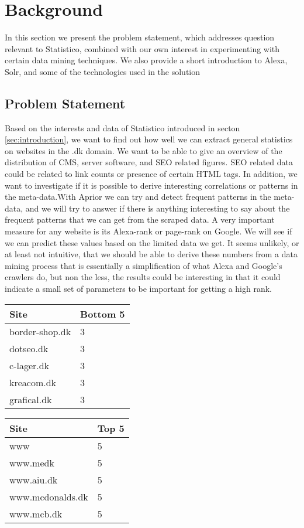 \section{Background}
\label{sec:background}
In this section we present the problem statement, which addresses question relevant to Statistico, combined with our own interest in experimenting with certain data mining techniques. We also provide a short introduction to Alexa, Solr, and some of the technologies used in the solution

\subsection{Problem Statement}
\label{subsec:problem_statement}
Based on the interests and data of Statistico introduced in secton \ref{sec:introduction}, we want to find out how well we can extract general statistics on websites in the .dk domain. We want to be able to give an overview of the distribution of CMS, server software, and SEO related figures. SEO related data could be related to link counts or presence of certain HTML tags.
In addition, we want to investigate if it is possible to derive interesting correlations or patterns in the meta-data.With Aprior we can try and detect frequent patterns in the meta-data, and we will try to answer if there is anything interesting to say about the frequent patterns that we can get from the scraped data.
A very important measure for any website is its Alexa-rank or page-rank on Google. We will see if we can predict these values based on the limited data we get. It seems unlikely, or at least not intuitive, that we should be able to derive these numbers from a data mining process that is essentially a simplification of what Alexa and Google's crawlers do, but non the less, the results could be interesting in that it could indicate a small set of parameters to be important for getting a high rank.

\begin{tabular}{ p{130pt} | p{50pt} }
Site & Bottom 5\\
\hline border-shop.dk & 3\\
\hline dotseo.dk & 3\\
\hline c-lager.dk & 3\\
\hline kreacom.dk & 3\\
\hline grafical.dk & 3\\
\hline\end{tabular}


\begin{tabular}{ p{130pt} | p{} }
Site & Top 5\\
\hline www & 5\\
\hline www.medk & 5\\
\hline www.aiu.dk & 5\\
\hline www.mcdonalds.dk & 5\\
\hline www.mcb.dk & 5\\
\hline
\end{tabular}

